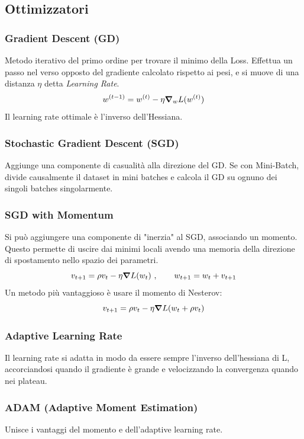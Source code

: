 \documentclass{article}
\begin{document}
\subsection*{Ottimizzatori}
\subsubsection*{Gradient Descent (GD)}
Metodo iterativo del primo ordine per trovare il minimo della Loss. Effettua un passo nel verso opposto del
gradiente calcolato rispetto ai pesi, e si muove di una distanza $\eta$ detta \textit{Learning Rate}.
\[
w^{(t-1)} = w^{(t)} - \eta \grad{}_w L(w^{(t)})
\]
Il learning rate ottimale è l'inverso dell'Hessiana.

\subsubsection*{Stochastic Gradient Descent (SGD)}
Aggiunge una componente di casualità alla direzione del GD. Se con Mini-Batch, divide causalmente il
dataset in mini batches e calcola il GD su ognuno dei singoli batches singolarmente.

\subsubsection*{SGD with Momentum}
Si può aggiungere una componente di "inerzia" al SGD, associando un momento.
Questo permette di uscire dai minimi locali avendo una memoria della direzione di spostamento nello spazio dei parametri.
\[
v_{t+1} = \rho v_t - \eta\grad{L(w_t)}\ , \qquad w_{t+1} = w_t + v_{t+1}
\]
Un metodo più vantaggioso è usare il momento di Nesterov:
\[
v_{t+1} = \rho v_t - \eta\grad{L(w_t + \rho v_t)}
\]

\subsubsection*{Adaptive Learning Rate}
Il learning rate si adatta in modo da essere sempre l'inverso dell'hessiana di L, accorciandosi quando il gradiente 
è grande e velocizzando la convergenza quando nei plateau.

\subsubsection*{ADAM (Adaptive Moment Estimation)}
Unisce i vantaggi del momento e dell'adaptive learning rate.
\end{document}
